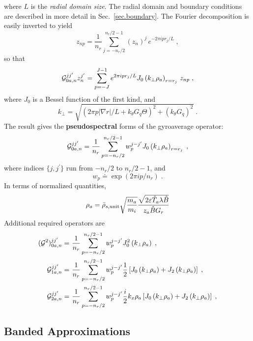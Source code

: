 \noindent
where $L$ is the {\it radial domain size}.  The radial domain and 
boundary conditions are described in more detail in Sec.~\ref{sec.boundary}.  The Fourier decomposition is easily 
inverted to yield
%
\begin{equation}
z_{np} = \frac{1}{n_r}\sum_{j=-n_r/2}^{n_r/2-1} (z_n)^j \, 
e^{-2 \pi i p r_j/L} \; ,
\end{equation}
%
so that
%
\begin{equation}
{\cal G}_{0a,n}^{jj^\prime} z_n^{j^\prime} = 
 \sum_{p=-J}^{J-1} e^{2 \pi i p r_j/L}  J_0 
 \left( k_\perp \rho_a \right)_{r=r_j}  \, z_{np} \; , 
\end{equation}
%
where $J_0$ is a Bessel function of the first kind, and
%
\begin{equation}
k_\perp = \sqrt{(2 \pi p |\nabla r| / L + k_\theta G_q \Theta)^2 
+ (k_\theta G_q)^2} \; .
\end{equation}
%
\noindent
The result gives the {\bf pseudospectral} forms of the gyroaverage 
operator:
%
\begin{equation}
{\cal G}_{0a,n}^{jj^\prime} = \frac{1}{n_r} \sum_{p=-n_r/2}^{n_r/2-1}
w_p^{j-j^\prime} J_0 \left( k_\perp \rho_a \right)_{r=r_j} \; , \label{eq.g} 
\end{equation}
%
\noindent
where indices $\{j,j^\prime\}$ run from $-n_r/2$ to $n_r/2-1$, 
and
%
\begin{equation}
w_p \doteq \exp(2 \pi i p/n_r) \; .
\end{equation}
%
In terms of normalized quantities, 
%
\begin{equation}
\rho_a = \bar{\rho}_{s,{\rm unit}} \sqrt{\frac{m_a}{m_i}} 
 \frac{\sqrt{2{\varepsilon}\hat{T}_a\lambda\hat{B}}}{z_a \hat{B} G_r}
\end{equation}
%
Additional required operators are
%
\begin{align}
({\cal G}^2)_{0a,n}^{jj^\prime} = &~\frac{1}{n_r} \sum_{p=-n_r/2}^{n_r/2-1}
w_p^{j-j^\prime} J_0^2 \left( k_\perp \rho_a \right) \; , \\
{\cal G}_{1a,n}^{jj^\prime} = &~\frac{1}{n_r} \sum_{p=-n_r/2}^{n_r/2-1}
w_p^{j-j^\prime} 
\frac{1}{2} \left[ J_0 \left( k_\perp \rho_a \right)
+ J_2 \left( k_\perp \rho_a \right) \right]  \; , \\
{\cal G}_{2a,n}^{jj^\prime} = &~\frac{1}{n_r} \sum_{p=-n_r/2}^{n_r/2-1}
w_p^{j-j^\prime} 
\frac{i}{2} k_x \rho_a \left[ J_0 \left( k_\perp \rho_a \right)
+ J_2 \left( k_\perp \rho_a \right) \right]  \; , 
\end{align}


\subsection{Banded Approximations}

